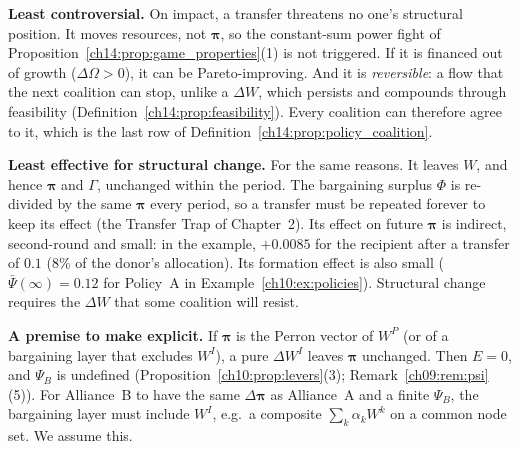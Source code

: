 \documentclass[../solutions_manual.tex]{subfiles}
\begin{document}
\textbf{Least controversial.} On impact, a transfer threatens no one's structural position. It moves resources, not $\boldsymbol{\pi}$, so the constant-sum power fight of Proposition~\ref{ch14:prop:game_properties}(1) is not triggered. If it is financed out of growth ($\Delta\Omega > 0$), it can be Pareto-improving. And it is \emph{reversible}: a flow that the next coalition can stop, unlike a $\Delta W$, which persists and compounds through feasibility (Definition~\ref{ch14:prop:feasibility}). Every coalition can therefore agree to it, which is the last row of Definition~\ref{ch14:prop:policy_coalition}.

\textbf{Least effective for structural change.} For the same reasons. It leaves $W$, and hence $\boldsymbol{\pi}$ and $\Gamma$, unchanged within the period. The bargaining surplus $\Phi$ is re-divided by the same $\boldsymbol{\pi}$ every period, so a transfer must be repeated forever to keep its effect (the Transfer Trap of Chapter~2). Its effect on future $\boldsymbol{\pi}$ is indirect, second-round and small: in the example, $+0.0085$ for the recipient after a transfer of $0.1$ (8\% of the donor's allocation). Its formation effect is also small ($\bar\Psi(\infty) = 0.12$ for Policy~A in Example~\ref{ch10:ex:policies}). Structural change requires the $\Delta W$ that some coalition will resist.

\textbf{A premise to make explicit.} If $\boldsymbol{\pi}$ is the Perron vector of $W^P$ (or of a bargaining layer that excludes $W^I$), a pure $\Delta W^I$ leaves $\boldsymbol{\pi}$ unchanged. Then $E = 0$, and $\Psi_B$ is undefined (Proposition~\ref{ch10:prop:levers}(3); Remark~\ref{ch09:rem:psi}(5)). For Alliance~B to have the same $\Delta\boldsymbol{\pi}$ as Alliance~A and a finite $\Psi_B$, the bargaining layer must include $W^I$, e.g.\ a composite $\sum_k\alpha_kW^k$ on a common node set. We assume this.
\end{document}

